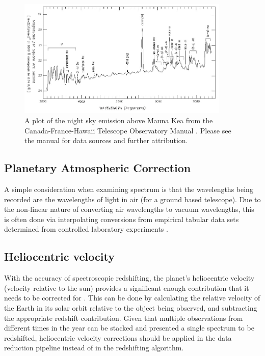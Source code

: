 \documentclass[titlesmallcaps, examinerscopy, copyrightpage]{uqthesis}
\begin{document}
\begin{figure}[ht!]
\includegraphics[width=0.9\textwidth]{images/om-nskyvis.jpg} 
\centering
\caption{A plot of the night sky emission above Mauna Kea from the Canada-France-Hawaii Telescope Observatory Manual \cite{night}. Please see the manual for data sources and further attribution.}
\label{fig:night}
\end{figure}

\subsection{Planetary Atmospheric Correction}

A simple consideration when examining spectrum is that the wavelengths being recorded are the wavelengths of light in air (for a ground based telescope). Due to the non-linear nature of converting air wavelengths to vacuum wavelengths, this is often done via interpolating conversions from empirical tabular data sets determined from controlled laboratory experiments \cite{morton1991atomic}.

\subsection{Heliocentric velocity}

With the accuracy of spectroscopic redshifting, the planet's heliocentric velocity (velocity relative to the sun) provides a significant enough contribution that it needs to be corrected for \cite{colless20012df,baldry2014galaxy}. This can be done by calculating the relative velocity of the Earth in its solar orbit relative to the object being observed, and subtracting the appropriate redshift contribution. Given that multiple observations from different times in the year can be stacked and presented a single spectrum to be redshifted, heliocentric velocity corrections should be applied in the data reduction pipeline instead of in the redshifting algorithm.
\end{document}
